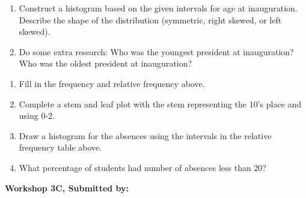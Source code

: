 \documentclass[11pt, chapterprefix=true]{scrbook}\usepackage[]{graphicx}\usepackage[]{color}
\begin{document}
\begin{exercises}
\begin{exercise}
\begin{enumerate}
    \item	Construct a histogram based on the given intervals for age at inauguration.  Describe the shape of the distribution (symmetric, right skewed, or left skewed).
    \item Do some extra research: Who was the youngest president at inauguration? Who was the oldest president at inauguration?
\end{enumerate}
    \end{exercise}
    \begin{solution} %

\begin{enumerate}
  \item	Fill in the frequency and relative frequency above.
  \item	Complete a stem and leaf plot with the stem representing the 10's place and using 0-2.
  \item	Draw a histogram for the absences using the intervals in the relative frequency table above.
  \item	What percentage of students had number of absences less than 20?
\end{enumerate}

    \end{solution} 
    
\clearpage

    \begin{exercise}  %

    \begin{center}
\begin{flushleft}\textbf{\large \hfill Workshop 3C, Submitted by: }\end{flushleft}

\end{center}


\end{exercise}
\end{exercises}
\end{document}
